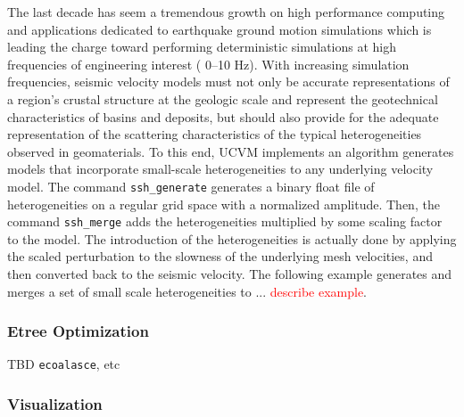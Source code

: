 The last decade has seem a tremendous growth on high performance computing and applications dedicated to earthquake ground motion simulations which is leading the charge toward performing deterministic simulations at high frequencies of engineering interest (\fmax{} 0--10 Hz). With increasing simulation frequencies, seismic velocity models must not only be accurate representations of a region's crustal structure at the geologic scale and represent the geotechnical characteristics of basins and deposits, but should also provide for the adequate representation of the scattering characteristics of the typical heterogeneities observed in geomaterials. To this end, UCVM implements an algorithm generates models that incorporate small-scale heterogeneities to any underlying velocity model. The command \texttt{ssh\_generate} generates a binary float file of heterogeneities on a regular grid space with a normalized amplitude. Then, the command \texttt{ssh\_merge} adds the heterogeneities multiplied by some scaling factor to the model. The introduction of the heterogeneities is actually done by applying the scaled perturbation to the slowness of the underlying mesh velocities, and then converted back to the seismic velocity. The following example generates and merges a set of small scale heterogeneities to ... \textcolor{red}{describe example}.

\subsubsection{Etree Optimization}

TBD \texttt{ecoalasce}, etc

\subsubsection{Visualization}


